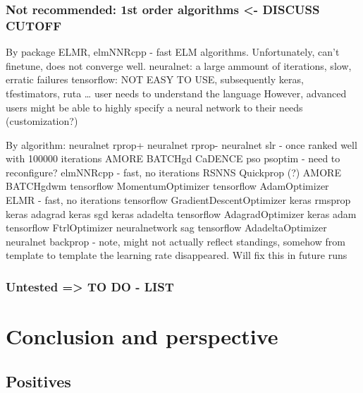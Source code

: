 \hypertarget{not-recommended-1st-order-algorithms---discuss-cutoff}{%
\subsubsection{Not recommended: 1st order algorithms \textless- DISCUSS
CUTOFF}\label{not-recommended-1st-order-algorithms---discuss-cutoff}}

By package ELMR, elmNNRcpp - fast ELM algorithms. Unfortunately, can't
finetune, does not converge well. neuralnet: a large ammount of
iterations, slow, erratic failures tensorflow: NOT EASY TO USE,
subsequently keras, tfestimators, ruta \ldots{} user needs to understand
the language However, advanced users might be able to highly specify a
neural network to their needs (customization?)

By algorithm: neuralnet rprop+ neuralnet rprop- neuralnet slr - once
ranked well with 100000 iterations AMORE BATCHgd CaDENCE pso psoptim -
need to reconfigure? elmNNRcpp - fast, no iterations RSNNS Quickprop (?)
AMORE BATCHgdwm tensorflow MomentumOptimizer tensorflow AdamOptimizer
ELMR - fast, no iterations tensorflow GradientDescentOptimizer keras
rmsprop keras adagrad keras sgd keras adadelta tensorflow
AdagradOptimizer keras adam tensorflow FtrlOptimizer neuralnetwork sag
tensorflow AdadeltaOptimizer neuralnet backprop - note, might not
actually reflect standings, somehow from template to template the
learning rate disappeared. Will fix this in future runs

\hypertarget{untested-to-do---list}{%
\subsubsection{Untested =\textgreater{} TO DO -
LIST}\label{untested-to-do---list}}

\hypertarget{conclusion-and-perspective}{%
\section{Conclusion and perspective}\label{conclusion-and-perspective}}

\hypertarget{positives}{%
\subsection{Positives}\label{positives}}

